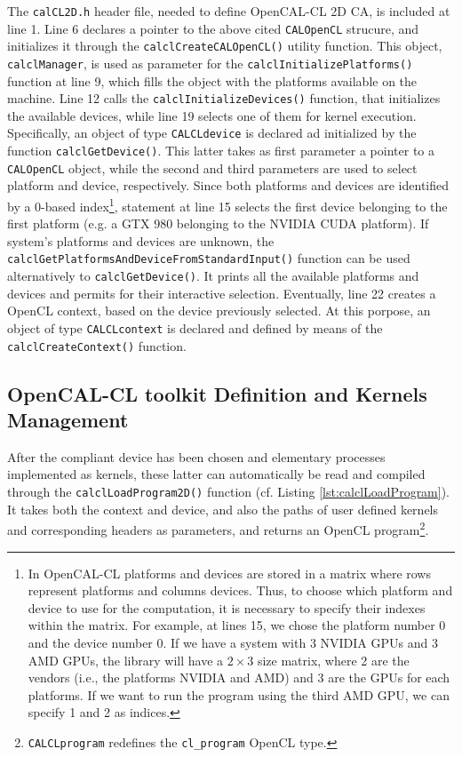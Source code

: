 The \verb'calCL2D.h' header file, needed to define OpenCAL-CL 2D CA,
is included at line 1. Line 6 declares a pointer to the above cited
\verb'CALOpenCL' strucure, and initializes it through the
\verb'calclCreateCALOpenCL()' utility function. This object,
\verb'calclManager', is used as parameter for the
\verb'calclInitializePlatforms()' function at line 9, which fills the
object with the platforms available on the machine. Line 12 calls the
\verb'calclInitializeDevices()' function, that initializes the
available devices, while line 19 selects one of them for kernel
execution. Specifically, an object of type \verb'CALCLdevice' is
declared ad initialized by the function \verb'calclGetDevice()'. This
latter takes as first parameter a pointer to a \verb'CALOpenCL'
object, while the second and third parameters are used to select
platform and device, respectively. Since both platforms and devices
are identified by a 0-based index\footnote{In OpenCAL-CL platforms and
  devices are stored in a matrix where rows represent platforms and
  columns devices. Thus, to choose which platform and device to use
  for the computation, it is necessary to specify their indexes within
  the matrix. For example, at lines 15, we chose the platform number 0
  and the device number 0. If we have a system with 3 NVIDIA GPUs and
  3 AMD GPUs, the library will have a $2 \times 3$ size matrix, where
  2 are the vendors (i.e., the platforms NVIDIA and AMD) and 3 are the
  GPUs for each platforms. If we want to run the program using the
  third AMD GPU, we can specify 1 and 2 as indices.}, statement at
line 15 selects the first device belonging to the first platform
(e.g. a GTX 980 belonging to the NVIDIA CUDA platform). If system's
platforms and devices are unknown, the
\verb'calclGetPlatformsAndDeviceFromStandardInput()' function can be
used alternatively to \verb'calclGetDevice()'. It prints all the
available platforms and devices and permits for their interactive
selection. Eventually, line 22 creates a OpenCL context, based on the
device previously selected. At this porpose, an object of type
\verb'CALCLcontext' is declared and defined by means of the
\verb'calclCreateContext()' function.

\subsection{OpenCAL-CL toolkit Definition and Kernels Management}

After the compliant device has been chosen and elementary processes
implemented as kernels, these latter can automatically be read and
compiled through the \verb'calclLoadProgram2D()' function
(cf. Listing \ref{lst:calclLoadProgram}). It takes both the context
and device, and also the paths of user defined kernels and
corresponding headers as parameters, and returns an OpenCL
program\footnote{\texttt{CALCLprogram} redefines the
\texttt{cl\_program} OpenCL type.}.

